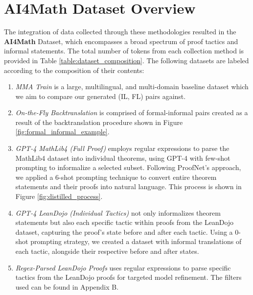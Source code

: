 \documentclass{article} %
\begin{document}
\section{AI4Math Dataset Overview}
The integration of data collected through these methodologies resulted in the \textbf{AI4Math} Dataset, which encompasses a broad spectrum of proof tactics and informal statements. The total number of tokens from each collection method is provided in Table \ref{table:dataset_composition}. The following datasets are labeled according to the composition of their contents:
\begin{enumerate}
    \item \textit{MMA Train} is a large, multilingual, and multi-domain baseline dataset \citep{mma} which we aim to compare our generated (IL, FL) pairs against. 
    
    \item \textit{On-the-Fly Backtranslation} is comprised of formal-informal pairs created as a result of the backtranslation procedure shown in Figure \ref{fig:formal_informal_example}.
    
    \item \textit{GPT-4 MathLib4 (Full Proof)} employs regular expressions to parse the MathLib4 dataset into individual theorems, using GPT-4 with few-shot prompting to informalize a selected subset. Following ProofNet's approach, we applied a 6-shot prompting technique to convert entire theorem statements and their proofs into natural language. This process is shown in Figure \ref{fig:distilled_process}.
        
    \item \textit{GPT-4 LeanDojo (Individual Tactics)} not only informalizes theorem statements but also each specific tactic within proofs from the LeanDojo dataset, capturing the proof's state before and after each tactic. Using a 0-shot prompting strategy, we created a dataset with informal translations of each tactic, alongside their respective before and after states.
    
    \item \textit{Regex-Parsed LeanDojo Proofs} uses regular expressions to parse specific tactics from the LeanDojo proofs for targeted model refinement. The filters used can be found in Appendix B.

\end{enumerate}
\end{document}

